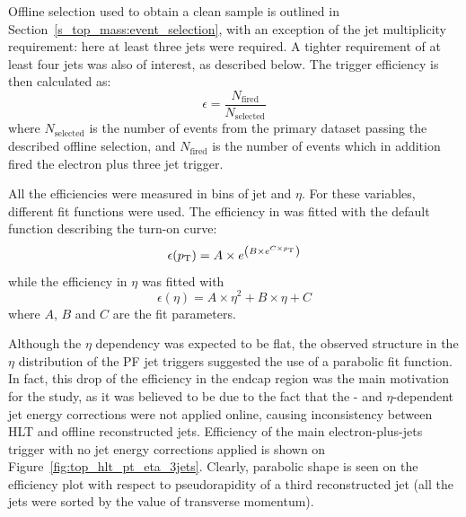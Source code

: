 Offline selection used to obtain a clean \ttbar sample is outlined in Section~\ref{s_top_mass:event_selection}, with an
exception of the jet multiplicity requirement: here at least three jets were required. A tighter requirement of at least
four jets was also of interest, as described below. The trigger efficiency is then calculated as:
\begin{equation}
\epsilon = \frac{N_{\text{fired}}}{N_{\text{selected}}}
\end{equation}
where $N_{\text{selected}}$ is the number of events from the primary dataset passing the described offline selection,
and $N_{\text{fired}}$ is the number of events which in addition fired the electron plus three jet trigger.

All the efficiencies were measured in bins of jet \pt and $\eta$. For these variables, different fit functions were
used. The efficiency in \pt was fitted with the default function describing the turn-on curve:
\begin{equation}
\epsilon(p_{\mathrm{T}}) = A \times e^{\left(B \times e^{C \times p_{\mathrm{T}}}\right)}
\end{equation}
while the efficiency in $\eta$ was fitted with
\begin{equation}
\epsilon (\eta) = A \times \eta^2 + B \times \eta + C
\end{equation}
where $A$, $B$ and $C$ are the fit parameters.

Although the $\eta$ dependency was expected to be flat, the observed structure in the $\eta$ distribution of the PF jet
triggers suggested the use of a parabolic fit function. In fact, this drop of the efficiency in the endcap region was
the main motivation for the study, as it was believed to be due to the fact that the \pt- and $\eta$-dependent jet
energy corrections were not applied online, causing inconsistency between HLT and offline reconstructed jets. Efficiency
of the main electron-plus-jets trigger with no jet energy corrections applied is shown on
Figure~\ref{fig:top_hlt_pt_eta_3jets}. Clearly, parabolic shape is seen on the efficiency plot with respect to
pseudorapidity of a third reconstructed jet (all the jets were sorted by the value of transverse momentum).

